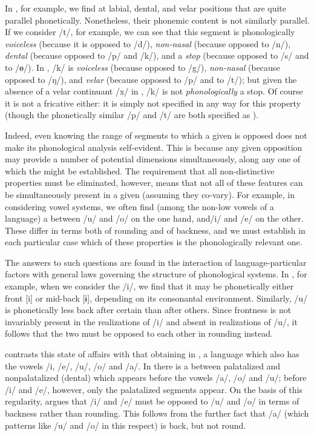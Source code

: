 In , for example, we find  at labial, dental, and velar
positions that are quite parallel phonetically. Nonetheless, their
phonemic content is not similarly parallel. If we consider /t/, for
example, we can see that this segment is phonologically
\emph{voiceless} (because it is opposed to /d/), \emph{non-nasal}
(because opposed to /n/), \emph{dental} (because opposed to /p/ and
/k/), and a \emph{stop} (because opposed to /s/ and to /ɵ/). In
, /k/ is \emph{voiceless} (because opposed to /g/),
\emph{non-nasal} (because opposed to /ŋ/), and \emph{velar} (because
opposed to /p/ and to /t/); but given the absence of a velar
continuant /x/ in , /k/ is not \emph{phonologically} a stop. Of
course it is not a fricative either: it is simply not specified in any
way for this property (though the phonetically similar /p/ and /t/ are
both specified as ).

Indeed, even knowing the range of segments to which a given  is
opposed does not make its phonological analysis self-evident. This is
because any given opposition may provide a number of potential
dimensions simultaneously, along any one of which the  might
be established. The requirement that all non-distinctive properties
must be eliminated, however, means that not all of these features can
be simultaneously present in a given  (assuming they
co-vary). For example, in considering vowel systems, we often find
(among the non-low vowels of a language) a  between /u/ and /o/
on the one hand, and/i/ and /e/ on the other. These differ in terms
both of rounding and of backness, and we must establish in each
particular case which of these properties is the phonologically
relevant one.

The answers to such questions are found in the interaction of
language-parti\-cu\-lar factors with general laws governing the
structure of phonological systems. In , for example, when we
consider the  /i/, we find that it may be phonetically either
front {[i]} or mid-back {[ɨ]}, depending on its consonantal
environment. Similarly, /u/ is phonetically less back after certain
 than after others. Since frontness is not invariably
present in the realizations of /i/ and absent in realizations of /u/,
it follows that the two must be opposed to each other in rounding
instead.

{\Trubetzkoy} contrasts this state of affairs with that obtaining in
, a language which also has the vowels /i, /e/, /u/, /o/ and
/a/. In  there is a  between palatalized and
nonpalatalized (dental)  which appears before the vowels
/a/, /o/ and /u/; before /i/ and /e/, however, only the palatalized
segments appear. On the basis of this regularity, {\Trubetzkoy} argues
that /i/ and /e/ must be opposed to /u/ and /o/ in terms of backness
rather than rounding. This follows from the further fact that /a/
(which patterns like /u/ and /o/ in this respect) is back, but not
round.

